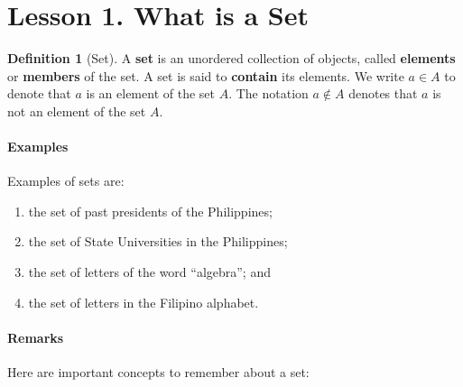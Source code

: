 \documentclass[]{book}
\providecommand{\tightlist}{%
  \setlength{\itemsep}{0pt}\setlength{\parskip}{0pt}}
\let\oldparagraph\paragraph
\renewcommand{\paragraph}[1]{\oldparagraph{#1}\mbox{}}
\theoremstyle{definition}
\newtheorem{definition}{Definition}[chapter]
\theoremstyle{definition}
\theoremstyle{definition}
\theoremstyle{remark}
\begin{document}
\hypertarget{lesson-1.-what-is-a-set}{%
\section*{Lesson 1. What is a Set}\label{lesson-1.-what-is-a-set}}

\begin{definition}[Set]
\protect\hypertarget{def:unnamed-chunk-1}{}{\label{def:unnamed-chunk-1} \iffalse (Set) \fi{} }A \textbf{set} is an unordered collection of objects, called \textbf{elements} or \textbf{members} of the set. A set is said to \textbf{contain} its elements. We write \(a \in A\) to denote that \(a\) is an element of the set \(A\). The notation \(a \notin A\) denotes that \(a\) is not an element of the set \(A\).
\end{definition}

\hypertarget{examples}{%
\paragraph{Examples}\label{examples}}

Examples of sets are:

\begin{enumerate}
\def\labelenumi{\arabic{enumi}.}
\tightlist
\item
  the set of past presidents of the Philippines;
\item
  the set of State Universities in the Philippines;
\item
  the set of letters of the word ``algebra''; and
\item
  the set of letters in the Filipino alphabet.
\end{enumerate}

\hypertarget{remarks}{%
\paragraph{Remarks}\label{remarks}}

Here are important concepts to remember about a set:
\end{document}
